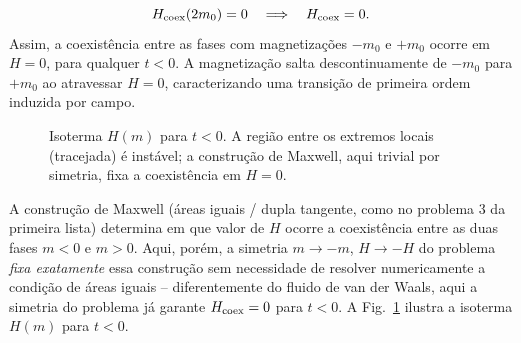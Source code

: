 \documentclass[11pt,a4paper]{article}
\begin{document}
%
\begin{equation}
    H_{\rm coex} (2m_0) = 0 \quad \Longrightarrow \quad H_{\rm coex} = 0.
\end{equation}
%
Assim, a coexistência entre as fases com magnetizações $-m_0$ e $+m_0$ ocorre em $H = 0$, para qualquer $t < 0$. A magnetização salta descontinuamente de $-m_0$ para $+m_0$ ao atravessar $H = 0$, caracterizando uma transição de primeira ordem induzida por campo.
%
\begin{figure}[h]
\centering
{}
\caption{Isoterma $H(m)$ para $t < 0$. A região entre os extremos locais (tracejada) é instável; a construção de Maxwell, aqui trivial por simetria, fixa a coexistência em $H = 0$.}
\label{fig:landau_Hm}
\end{figure}
%
A construção de Maxwell (áreas iguais / dupla tangente, como no problema 3 da primeira lista) determina em que valor de $H$ ocorre a coexistência entre as duas fases $m<0$ e $m>0$. Aqui, porém, a simetria $m\to-m$, $H\to-H$ do problema \emph{fixa exatamente} essa construção
sem necessidade de resolver numericamente a condição de áreas iguais -- diferentemente do fluido de van der Waals, aqui a simetria do problema já garante $H_{\rm coex}=0$ para $t<0$. A Fig.~\ref{fig:landau_Hm} ilustra a isoterma $H(m)$ para $t<0$.
%
\end{document}
